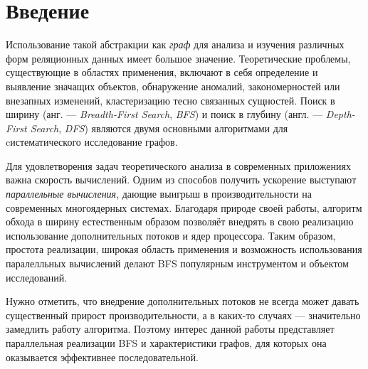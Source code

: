 
\section*{Введение}
Использование такой абстракции как \textit{граф} для анализа и изучения различных форм реляционных данных имеет большое значение. Теоретические проблемы, существующие в областях применения, включают в себя определение и выявление значащих объектов, обнаружение аномалий, закономерностей или внезапных изменений, кластеризацию тесно связанных сущностей. Поиск в ширину (анг. --- \textit{Breadth-First Search}, \textit{BFS}) и поиск в глубину (англ. --- \textit{Depth-First Search}, \textit{DFS}) являются двумя основными алгоритмами для cистематического исследование графов. 

Для удовлетворения задач теоретического анализа в современных приложениях важна скорость вычислений. Одним из способов получить ускорение выступают \textit{параллельные вычисления}, дающие выигрыш в производительности на современных многоядерных системах. Благодаря природе своей работы, алгоритм обхода в ширину естественным образом позволяёт внедрять в свою реализацию использование дополнительных потоков и ядер процессора. Таким образом, простота реализации, широкая область применения и возможность использования паралелльных вычислений делают BFS популярным инструментом и объектом исследований.

Нужно отметить, что внедрение дополнительных потоков не всегда может давать существенный прирост производительности, а в каких-то случаях --- значительно замедлить работу алгоритма. Поэтому интерес данной работы представляет параллельная реализации BFS и характеристики графов, для которых она оказывается эффективнее последовательной.

